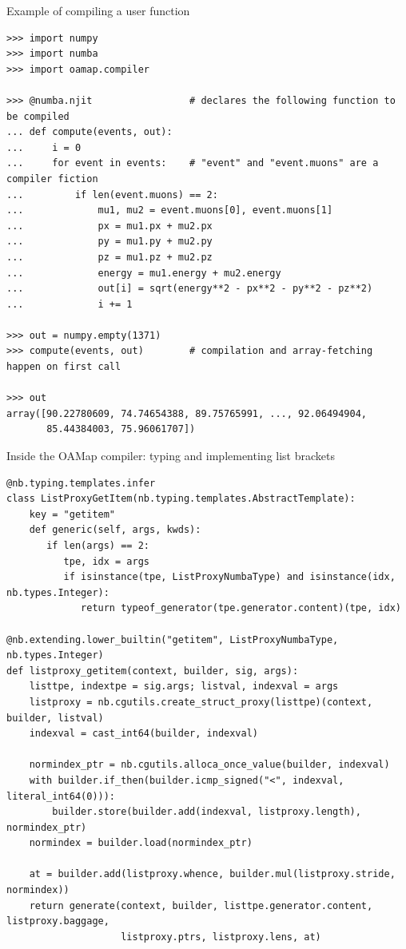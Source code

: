 \documentclass[aspectratio=169]{beamer}
\begin{document}
\begin{frame}[fragile]{Example of compiling a user function}
\vspace{0.15 cm}
\scriptsize
\begin{verbatim}
>>> import numpy
>>> import numba
>>> import oamap.compiler

>>> @numba.njit                 # declares the following function to be compiled
... def compute(events, out):
...     i = 0
...     for event in events:    # "event" and "event.muons" are a compiler fiction
...         if len(event.muons) == 2:
...             mu1, mu2 = event.muons[0], event.muons[1]
...             px = mu1.px + mu2.px
...             py = mu1.py + mu2.py
...             pz = mu1.pz + mu2.pz
...             energy = mu1.energy + mu2.energy
...             out[i] = sqrt(energy**2 - px**2 - py**2 - pz**2)
...             i += 1

>>> out = numpy.empty(1371)
>>> compute(events, out)        # compilation and array-fetching happen on first call

>>> out
array([90.22780609, 74.74654388, 89.75765991, ..., 92.06494904,
       85.44384003, 75.96061707])
\end{verbatim}
\end{frame}

\begin{frame}[fragile]{Inside the OAMap compiler: typing and implementing list brackets}
\vspace{0.15 cm}
\scriptsize
\begin{verbatim}
@nb.typing.templates.infer
class ListProxyGetItem(nb.typing.templates.AbstractTemplate):
    key = "getitem"
    def generic(self, args, kwds):
       if len(args) == 2:
          tpe, idx = args
          if isinstance(tpe, ListProxyNumbaType) and isinstance(idx, nb.types.Integer):
             return typeof_generator(tpe.generator.content)(tpe, idx)

@nb.extending.lower_builtin("getitem", ListProxyNumbaType, nb.types.Integer)
def listproxy_getitem(context, builder, sig, args):
    listtpe, indextpe = sig.args; listval, indexval = args
    listproxy = nb.cgutils.create_struct_proxy(listtpe)(context, builder, listval)
    indexval = cast_int64(builder, indexval)

    normindex_ptr = nb.cgutils.alloca_once_value(builder, indexval)
    with builder.if_then(builder.icmp_signed("<", indexval, literal_int64(0))):
        builder.store(builder.add(indexval, listproxy.length), normindex_ptr)
    normindex = builder.load(normindex_ptr)

    at = builder.add(listproxy.whence, builder.mul(listproxy.stride, normindex))
    return generate(context, builder, listtpe.generator.content, listproxy.baggage,
                    listproxy.ptrs, listproxy.lens, at)
\end{verbatim}
\end{frame}
\end{document}
